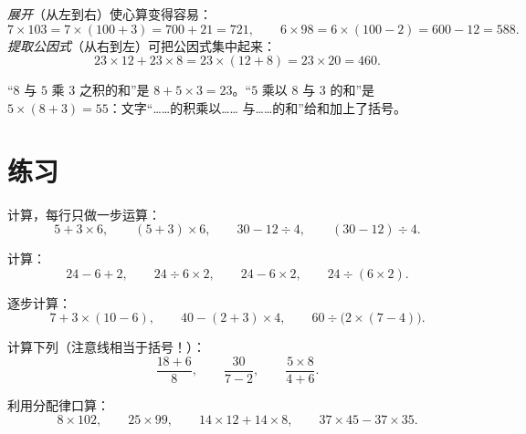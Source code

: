 \begin{example}[两个方向]\label{ex:g7:priorities:distributivity}
\emph{展开}（从左到右）使心算变得容易：
\[
7 \times 103 = 7 \times (100 + 3) = 700 + 21 = 721,
\qquad
6 \times 98 = 6 \times (100 - 2) = 600 - 12 = 588 .
\]
\emph{提取公因式}（从右到左）可把公因式集中起来：
\[
23 \times 12 + 23 \times 8 = 23 \times (12 + 8) = 23 \times 20 = 460 .
\]
\end{example}

\begin{example}[把文字译成算式]\label{ex:g7:priorities:words}
“$8$ 与 $5$ 乘 $3$ 之积的和”是 $8 + 5 \times 3 =
23$。“$5$ 乘以 $8$ 与 $3$ 的和”是
$5 \times (8 + 3) = 55$：文字“……的积乘以……
与……的和”给和加上了括号。
\end{example}

\section{练习}

\begin{exercise}[$\star$]\label{exo:g7:priorities:1}
计算，每行只做一步运算：
\[
5 + 3 \times 6, \qquad
(5 + 3) \times 6, \qquad
30 - 12 \div 4, \qquad
(30 - 12) \div 4 .
\]
\end{exercise}

\begin{exercise}[$\star$]\label{exo:g7:priorities:2}
计算：
\[
24 - 6 + 2, \qquad
24 \div 6 \times 2, \qquad
24 - 6 \times 2, \qquad
24 \div (6 \times 2).
\]
\end{exercise}

\begin{exercise}[$\star$]\label{exo:g7:priorities:3}
逐步计算：
\[
7 + 3 \times (10 - 6), \qquad
40 - (2 + 3) \times 4, \qquad
60 \div \bigl(2 \times (7 - 4)\bigr).
\]
\end{exercise}

\begin{exercise}[$\star$]\label{exo:g7:priorities:4}
计算下列（注意线相当于括号！）：
\[
\frac{18 + 6}{8}, \qquad
\frac{30}{7 - 2}, \qquad
\frac{5 \times 8}{4 + 6} .
\]
\end{exercise}

\begin{exercise}[$\star$]\label{exo:g7:priorities:5}
利用分配律口算：
\[
8 \times 102, \qquad
25 \times 99, \qquad
14 \times 12 + 14 \times 8, \qquad
37 \times 45 - 37 \times 35 .
\]
\end{exercise}

